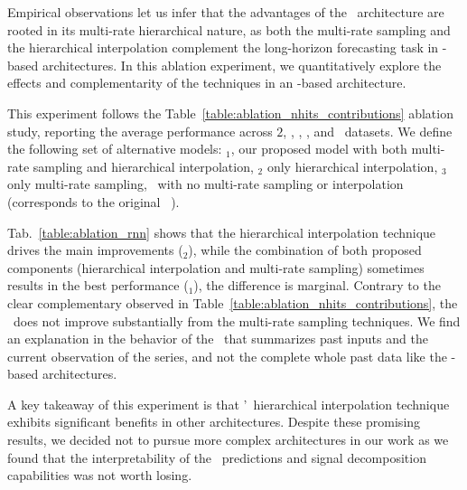 Empirical observations let us infer that the advantages of the \ours\ architecture are rooted in its multi-rate hierarchical nature, as both the multi-rate sampling and the hierarchical interpolation complement the long-horizon forecasting task in \MLP-based architectures. In this ablation experiment, we quantitatively explore the effects and complementarity of the techniques in an \RNN-based architecture.

This experiment follows the Table~\ref{table:ablation_nhits_contributions} ablation study, reporting the average performance across \ETTm$2$, \Electricity, \Exchange, \TrafficL, and \Weather\ datasets. We define the following set of alternative models: \DilRNN$_{1}$, our proposed model with both multi-rate sampling and hierarchical interpolation, \DilRNN$_{2}$ only hierarchical interpolation, \DilRNN$_{3}$ only multi-rate sampling, \DilRNN\ with no multi-rate sampling or interpolation (corresponds to the original \DilRNN~\citep{chang2017dilatedRNN}).

Tab.~\ref{table:ablation_rnn} shows that the hierarchical interpolation technique drives the main improvements (\DilRNN$_{2}$), while the combination of both proposed components (hierarchical interpolation and multi-rate sampling) sometimes results in the best performance (\DilRNN$_{1}$), the difference is marginal. Contrary to the clear complementary observed in Table~\ref{table:ablation_nhits_contributions}, the \DilRNN\ does not improve substantially from the multi-rate sampling techniques. We find an explanation in the behavior of the \RNN\ that summarizes past inputs and the current observation of the series, and not the complete whole past data like the \MLP-based architectures. 

A key takeaway of this experiment is that \ours'\ hierarchical interpolation technique exhibits significant benefits in other architectures. Despite these promising results, we decided not to pursue more complex architectures in our work as we found that the interpretability of the \ours\ predictions and signal decomposition capabilities was not worth losing.

